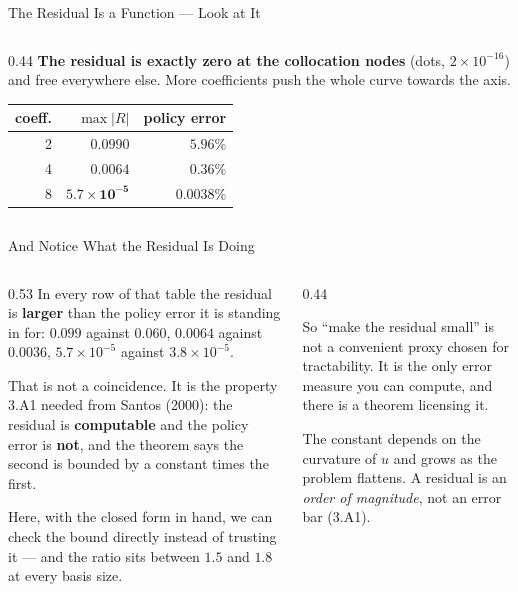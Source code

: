 \begin{frame}{The Residual Is a Function --- Look at It}
\begin{columns}[T]
\begin{column}{0.44\textwidth}
\textbf{The residual is exactly zero at the collocation nodes} (dots, $2\times10^{-16}$) and free everywhere else. More coefficients push the whole curve towards the axis.
\medskip
\begin{center}\footnotesize
\begin{tabularx}{\linewidth}{@{}r r r@{}}
\toprule
coeff. & $\max|R|$ & policy error \\
\midrule
2 & $0.0990$ & $5.96\%$ \\
4 & $0.0064$ & $0.36\%$ \\
8 & $\mathbf{5.7\times10^{-5}}$ & $\mathbf{0.0038\%}$ \\
\bottomrule
\end{tabularx}
\end{center}
\end{column}
\end{columns}
\vspace{1mm}
\end{frame}

\begin{frame}{And Notice What the Residual Is Doing}
\begin{columns}[T]
\begin{column}{0.53\textwidth}
\small
In every row of that table the residual is \textbf{larger} than the policy error it is standing in for: $0.099$ against $0.060$, $0.0064$ against $0.0036$, $5.7\times10^{-5}$ against $3.8\times10^{-5}$.
\medskip

That is not a coincidence. It is the property 3.A1 needed from Santos (2000): the residual is \textbf{computable} and the policy error is \textbf{not}, and the theorem says the second is bounded by a constant times the first.
\medskip

Here, with the closed form in hand, we can check the bound directly instead of trusting it --- and the ratio sits between $1.5$ and $1.8$ at every basis size.
\end{column}
\begin{column}{0.44\textwidth}
\begin{takeawaybox}\footnotesize
So ``make the residual small'' is not a convenient proxy chosen for tractability. It is the only error measure you can compute, and there is a theorem licensing it.
\end{takeawaybox}
\medskip
\begin{cautionbox}\footnotesize
The constant depends on the curvature of $u$ and grows as the problem flattens. A residual is an \emph{order of magnitude}, not an error bar (3.A1).
\end{cautionbox}
\end{column}
\end{columns}
\vspace{1mm}
\end{frame}


